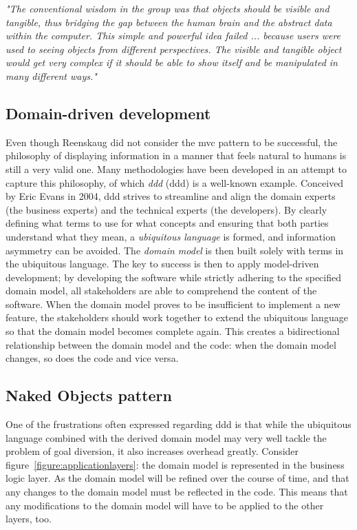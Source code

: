 \begin{displayquote}
\textit{"The conventional wisdom in the group was that objects should be visible and tangible, thus bridging the gap between the human brain and the abstract data within the computer. This simple and powerful idea failed ... because users were used to seeing objects from different perspectives. The visible and tangible object would get very complex if it should be able to show itself and be manipulated in many different ways."}
\end{displayquote}

\subsection{Domain-driven development}
\label{subsection:domaindrivendevelopment}
Even though Reenskaug did not consider the \acrshort{mvc} pattern to be successful, the philosophy of displaying information in a manner that feels natural to humans is still a very valid one. Many methodologies have been developed in an attempt to capture this philosophy, of which \textit{\acrlong{ddd}} (\acrshort{ddd}) is a well-known example. Conceived by Eric Evans in 2004, \acrshort{ddd} strives to streamline and align the domain experts (the business experts) and the technical experts (the developers). By clearly defining what terms to use for what concepts and ensuring that both parties understand what they mean, a \textit{ubiquitous language} is formed, and information asymmetry can be avoided\cite{evans2004domain}. The \textit{domain model} is then built solely with terms in the ubiquitous language. The key to success is then to apply model-driven development; by developing the software while strictly adhering to the specified domain model, all stakeholders are able to comprehend the content of the software. When the domain model proves to be insufficient to implement a new feature, the stakeholders should work together to extend the ubiquitous language so that the domain model becomes complete again. This creates a bidirectional relationship between the domain model and the code: when the domain model changes, so does the code and vice versa.

\subsection{Naked Objects pattern}
\label{subsection:nakedobjectspattern}
One of the frustrations often expressed regarding \acrshort{ddd} is that while the ubiquitous language combined with the derived domain model may very well tackle the problem of goal diversion, it also increases overhead greatly. Consider figure~\ref{figure:applicationlayers}: the domain model is represented in the business logic layer. As the domain model will be refined over the course of time, and that any changes to the domain model must be reflected in the code. This means that any modifications to the domain model will have to be applied to the other layers, too.

